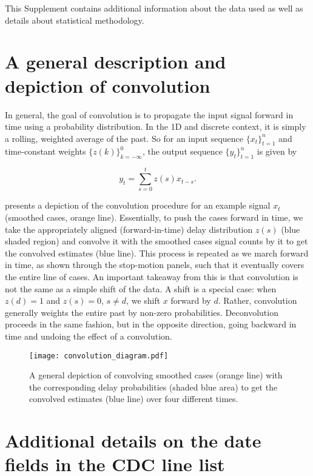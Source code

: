 This Supplement contains additional information about the data used as well as
details about statistical methodology.

\section{A general description and depiction of convolution}
\label{sec:convol}

In general, the goal of convolution is to propagate the input signal forward in
time using a probability distribution. In the 1D and discrete context, it is
simply a rolling, weighted average of the past. So for an input sequence
$\{x_t\}_{t=1}^n$ and time-constant weights $\{z(k)\}_{k=-\infty}^0$, the output
sequence $\{y_t\}_{t=1}^n$ is given by
\begin{linenomath*}
\begin{equation}
    y_t = \sum_{s=0}^t z(s)x_{t-s}.
\end{equation}
\end{linenomath*}
 presents a depiction of the convolution procedure for an
example signal $x_t$ (smoothed cases, orange line). Essentially, to push the
cases forward in time, we take the appropriately aligned (forward-in-time) delay
distribution $z(s)$ (blue shaded region) and convolve it with the smoothed cases
signal counts by it to get the convolved  estimates (blue line). This process is
repeated as we march forward in time, as shown through the stop-motion panels,
such that it eventually covers the entire line of cases. An important takeaway
from this is that convolution is not the same as a simple shift of the data.
A shift is a special case: when $z(d)=1$ and $z(s)=0$, $s\neq d$, we shift $x$
forward by $d$. Rather, convolution generally weights the entire past by
non-zero probabilities. Deconvolution proceeds in the same fashion, but in the
opposite direction, going backward in time and undoing the effect of a
convolution. 

\begin{figure}[H]
\centering
    \texttt{[image: convolution\_diagram.pdf]}
    \caption{A general depiction of convolving smoothed cases (orange line) with the corresponding delay probabilities (shaded blue area) to get the convolved estimates (blue line) over four different times.}
    \label{fig:convol}
\end{figure}

\section{Additional details on the date fields in the CDC line list}
\label{sec:linelist-details}

